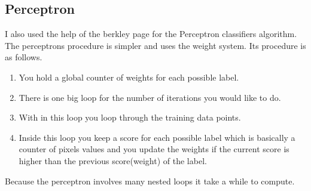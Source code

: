 \documentclass[11]{article}
\begin{document}
\subsection*{Perceptron}
\qquad I also used the help of the berkley page for the Perceptron classifiers algorithm.
\\ The perceptrons procedure is simpler and uses the weight system. Its procedure is as follows.
\begin{enumerate}
	\item You hold a global counter of weights for each possible label.
	\item There is one big loop for the number of iterations you would like to do.
	\item With in this loop you loop through the training data points.
	\item Inside this loop you keep a score for each possible label which is basically a counter of pixels values and you update the weights if the current score is higher than the previous score(weight) of the label.
\end{enumerate}

Because the perceptron involves many nested loops it take a while to compute.
\end{document}
